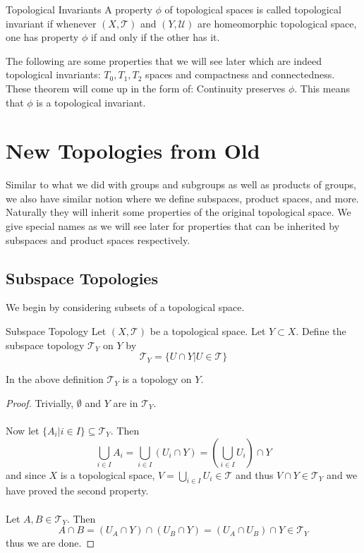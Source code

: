 \begin{defn}{Topological Invariants}{} A property $\phi$ of topological spaces is called topological invariant if whenever $(X,\mathcal{T})$ and $(Y,\mathcal{U})$ are homeomorphic topological space, one has property $\phi$ if and only if the other has it. 
\end{defn}

The following are some properties that we will see later which are indeed topological invariants: $T_0,T_1,T_2$ spaces and compactness and connectedness. These theorem will come up in the form of: Continuity preserves $\phi$. This means that $\phi$ is a topological invariant. 

\pagebreak
\section{New Topologies from Old}
Similar to what we did with groups and subgroups as well as products of groups, we also have similar notion where we define subspaces, product spaces, and more. Naturally they will inherit some properties of the original topological space. We give special names as we will see later for properties that can be inherited by subspaces and product spaces respectively. 
\subsection{Subspace Topologies}
We begin by considering subsets of a topological space. 
\begin{defn}{Subspace Topology}{} Let $(X,\mathcal{T})$ be a topological space. Let $Y\subset X$. Define the subspace topology $\mathcal{T}_Y$ on $Y$ by $$\mathcal{T}_Y=\{U\cap Y|U\in\mathcal{T}\}$$
\end{defn}

\begin{prp}{}{} In the above definition $\mathcal{T}_Y$ is a topology on $Y$. \tcbline
\begin{proof}
Trivially, $\emptyset$ and $Y$ are in $\mathcal{T}_Y$. \\~\\
Now let $\{A_i|i\in I\}\subseteq\mathcal{T}_Y$. Then $$\bigcup_{i\in I}A_i=\bigcup_{i\in I}(U_i\cap Y)=\left(\bigcup_{i\in I}U_i\right)\cap Y$$ and since $X$ is a topological space, $V=\bigcup_{i\in I}U_i\in\mathcal{T}$ and thus $V\cap Y\in\mathcal{T}_Y$ and we have proved the second property. \\~\\
Let $A,B\in\mathcal{T}_Y$. Then $$A\cap B=(U_A\cap Y)\cap(U_B\cap Y)=(U_A\cap U_B)\cap Y\in\mathcal{T}_Y$$ thus we are done. 
\end{proof}
\end{prp}

